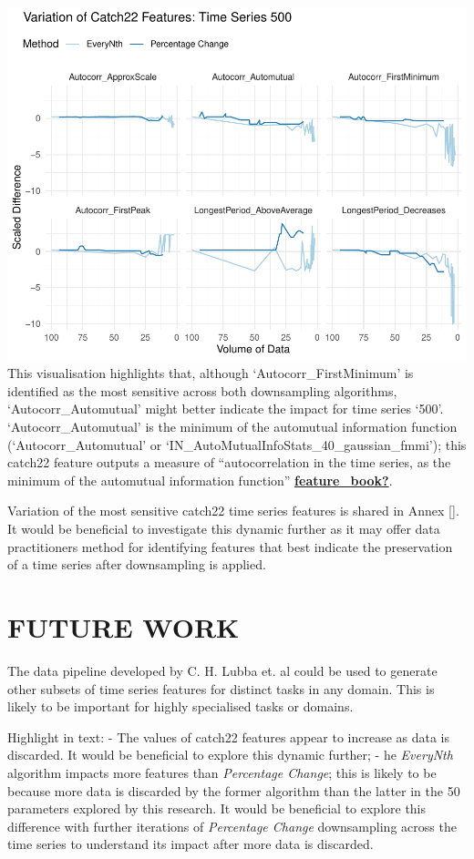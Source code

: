 \documentclass{article}
\begin{document}
\includegraphics{210431461_CSC8639_Dissertation_files/figure-latex/Catch22Variation-1.pdf}
This visualisation highlights that, although `Autocorr\_FirstMinimum' is
identified as the most sensitive across both downsampling algorithms,
`Autocorr\_Automutual' might better indicate the impact for time series
`500'. `Autocorr\_Automutual' is the minimum of the automutual
information function (`Autocorr\_Automutual' or
`IN\_AutoMutualInfoStats\_40\_gaussian\_fmmi'); this catch22 feature
outputs a measure of ``autocorrelation in the time series, as the
minimum of the automutual information function''
\protect\hyperlink{ref-feature_book}{\textbf{feature\_book?}}.

Variation of the most sensitive catch22 time series features is shared
in Annex {[}{]}. It would be beneficial to investigate this dynamic
further as it may offer data practitioners method for identifying
features that best indicate the preservation of a time series after
downsampling is applied.

\hypertarget{future-work}{%
\section{FUTURE WORK}\label{future-work}}

\label{sec:headings}

The data pipeline developed by C. H. Lubba et. al could be used to
generate other subsets of time series features for distinct tasks in any
domain. This is likely to be important for highly specialised tasks or
domains.

Highlight in text: - The values of catch22 features appear to increase
as data is discarded. It would be beneficial to explore this dynamic
further; - he \emph{EveryNth} algorithm impacts more features than
\emph{Percentage Change}; this is likely to be because more data is
discarded by the former algorithm than the latter in the 50 parameters
explored by this research. It would be beneficial to explore this
difference with further iterations of \emph{Percentage Change}
downsampling across the time series to understand its impact after more
data is discarded.
\end{document}
